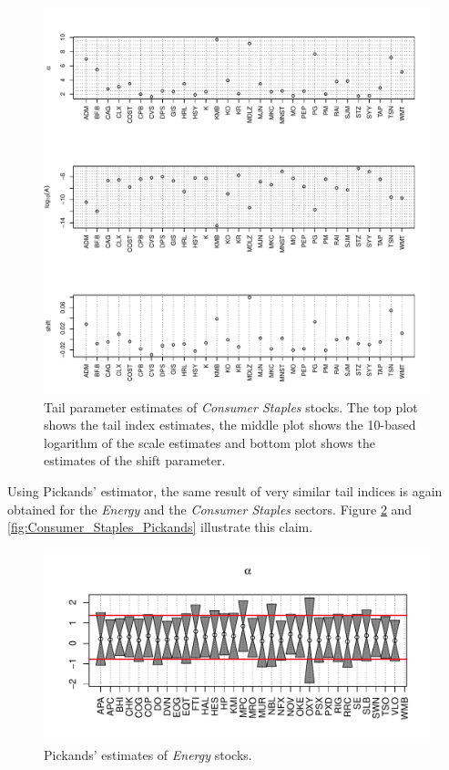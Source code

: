 \documentclass{article}
\newcommand{\1}[1]{
  \mathbf{1}_{\{#1\}}
}
\begin{document}
\begin{figure}[htb!]
  \includegraphics[width=\textwidth]{Consumer_Staples_OLS_estimates.pdf}
  \caption{Tail parameter estimates of {\it Consumer Staples}
    stocks. The top 
    plot shows the tail index estimates, the middle plot shows the
    10-based logarithm of the scale estimates and bottom plot shows
    the estimates of the shift parameter.
  }
  \label{fig:Consumer_Staples_OLS_estimates}
\end{figure}

Using Pickands' estimator, the same result of very similar tail indices
is again obtained for the {\it Energy} and the {\it Consumer Staples}
sectors. Figure \ref{fig:Energy_Pickands} and
\ref{fig:Consumer_Staples_Pickands} illustrate this claim.
\begin{figure}[htb!]
  \includegraphics[width=\textwidth]{Energy_Pickands.pdf}
  \caption{Pickands' estimates of {\it Energy} stocks.}
  \label{fig:Energy_Pickands}
\end{figure}
\end{document}
